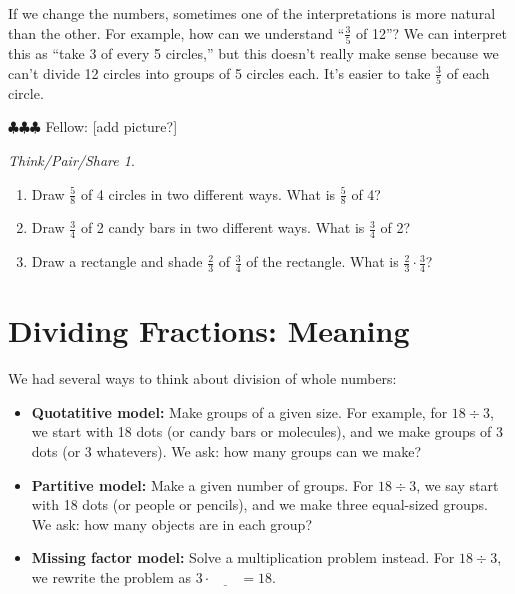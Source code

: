 \documentclass[10pt, reqno]{amsart}
\theoremstyle{remark}
\newtheorem*{thinkpair*}{Think/Pair/Share}
\theoremstyle{definition}
\numberwithin{equation}{section}  %
\newcommand{\fellow}[1]{{\color{magenta} \sf $\clubsuit\clubsuit\clubsuit$ Fellow: [#1]}}
\begin{document}
If we change the numbers, sometimes one of the interpretations is more natural than the other.  For example, how can we understand ``$\frac 3 5$ of 12''?  We can interpret this as ``take 3 of every 5 circles,'' but this doesn't really make sense because we can't divide 12 circles into groups of 5 circles each.  It's easier to take $\frac 3 5$ of each circle.

\fellow{add picture?}


\begin{thinkpair*}\ 
\begin{enumerate}
\item
Draw $\frac 5 8$ of 4 circles in two different ways.  What is $\frac 5 8$ of 4?\\
\item
 Draw $\frac 3 4$ of 2 candy bars in two different ways.  What is $\frac 3 4$ of 2?\\
 \item
 Draw a rectangle and shade $\frac 2 3$ of $\frac 3 4$ of the rectangle.  What is $\frac 23 \cdot \frac 3 4$?\
 \end{enumerate}

\end{thinkpair*}






\section{Dividing Fractions: Meaning}
We had several ways to think about division of whole numbers:
\begin{itemize}
\item
{\bf Quotatitive model:} Make groups of a given size.  For example, for $18 \div 3$, we start with 18 dots (or candy bars or molecules), and we make groups of 3 dots (or 3 whatevers).  We ask: how many groups can we make?\\

\item
{\bf Partitive model:} Make a given number of groups.  For $18 \div 3$, we say start with 18 dots (or people or pencils), and we make three equal-sized groups.  We ask: how many objects are in each group?\\

\item
{\bf Missing factor model:} Solve a multiplication problem instead.  For $18 \div 3$, we rewrite the problem as $3 \cdot \underline{\qquad} = 18$.\\
\end{itemize}
\end{document}
